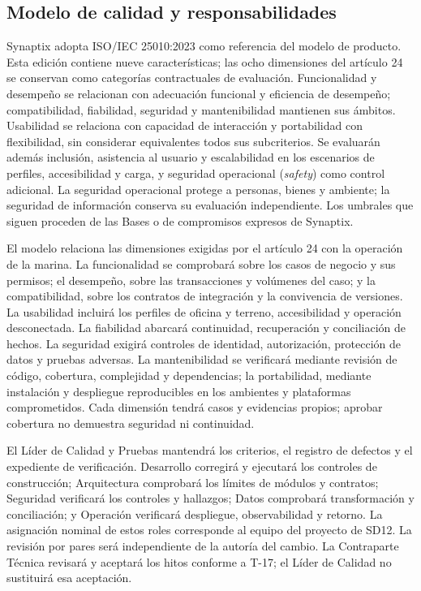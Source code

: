 \subsection{Modelo de calidad y responsabilidades}
Synaptix adopta ISO/IEC 25010:2023 como referencia del modelo de producto. Esta edición contiene nueve características; las ocho dimensiones del artículo 24 se conservan como categorías contractuales de evaluación. Funcionalidad y desempeño se relacionan con adecuación funcional y eficiencia de desempeño; compatibilidad, fiabilidad, seguridad y mantenibilidad mantienen sus ámbitos. Usabilidad se relaciona con capacidad de interacción y portabilidad con flexibilidad, sin considerar equivalentes todos sus subcriterios. Se evaluarán además inclusión, asistencia al usuario y escalabilidad en los escenarios de perfiles, accesibilidad y carga, y seguridad operacional (\textit{safety}) como control adicional. La seguridad operacional protege a personas, bienes y ambiente; la seguridad de información conserva su evaluación independiente. Los umbrales que siguen proceden de las Bases o de compromisos expresos de Synaptix. \parencites{sd9-25010}[art.~4.3, pp.~5--6; art.~24, p.~17]{sd9-ba}

El modelo relaciona las dimensiones exigidas por el artículo 24 con la operación de la marina. La funcionalidad se comprobará sobre los casos de negocio y sus permisos; el desempeño, sobre las transacciones y volúmenes del caso; y la compatibilidad, sobre los contratos de integración y la convivencia de versiones. La usabilidad incluirá los perfiles de oficina y terreno, accesibilidad y operación desconectada. La fiabilidad abarcará continuidad, recuperación y conciliación de hechos. La seguridad exigirá controles de identidad, autorización, protección de datos y pruebas adversas. La mantenibilidad se verificará mediante revisión de código, cobertura, complejidad y dependencias; la portabilidad, mediante instalación y despliegue reproducibles en los ambientes y plataformas comprometidos. Cada dimensión tendrá casos y evidencias propios; aprobar cobertura no demuestra seguridad ni continuidad. \parencite[art.~24, p.~17]{sd9-ba}

El Líder de Calidad y Pruebas mantendrá los criterios, el registro de defectos y el expediente de verificación. Desarrollo corregirá y ejecutará los controles de construcción; Arquitectura comprobará los límites de módulos y contratos; Seguridad verificará los controles y hallazgos; Datos comprobará transformación y conciliación; y Operación verificará despliegue, observabilidad y retorno. La asignación nominal de estos roles corresponde al equipo del proyecto de SD12. La revisión por pares será independiente de la autoría del cambio. La Contraparte Técnica revisará y aceptará los hitos conforme a T-17; el Líder de Calidad no sustituirá esa aceptación.

